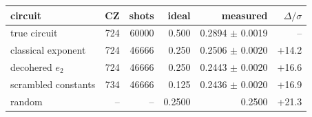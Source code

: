 \begin{tabular}{lrrrrr}
\toprule
circuit & CZ & shots & ideal & measured & $\Delta/\sigma$ \\
\midrule
true circuit & 724 & 60000 & 0.500 & 0.2894 $\pm$ 0.0019 & -- \\
classical exponent & 724 & 46666 & 0.250 & 0.2506 $\pm$ 0.0020 & +14.2 \\
decohered $e_2$ & 724 & 46666 & 0.250 & 0.2443 $\pm$ 0.0020 & +16.6 \\
scrambled constants & 734 & 46666 & 0.125 & 0.2436 $\pm$ 0.0020 & +16.9 \\
random & -- & -- & 0.2500 & 0.2500 & +21.3 \\
\bottomrule
\end{tabular}
